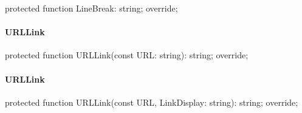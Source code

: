 \documentclass{report}
\newif\ifpdf
\begin{document}
\label{PasDoc_GenHtml.TGenericHTMLDocGenerator-LineBreak}
\begin{list}{}{
\setlength{\itemindent}{0cm}
\setlength{\listparindent}{0cm}
\setlength{\leftmargin}{\evensidemargin}
\addtolength{\leftmargin}{\tmplength}
\settowidth{\labelsep}{X}
\addtolength{\leftmargin}{\labelsep}
\setlength{\labelwidth}{\tmplength}
}
\item[\textbf{Declaration}\hfill]
\ifpdf
\begin{flushleft}
\fi
\begin{ttfamily}
protected function LineBreak: string; override;\end{ttfamily}

\ifpdf
\end{flushleft}
\fi

\end{list}
\paragraph*{URLLink}\hspace*{\fill}

\label{PasDoc_GenHtml.TGenericHTMLDocGenerator-URLLink}
\begin{list}{}{
\setlength{\itemindent}{0cm}
\setlength{\listparindent}{0cm}
\setlength{\leftmargin}{\evensidemargin}
\addtolength{\leftmargin}{\tmplength}
\settowidth{\labelsep}{X}
\addtolength{\leftmargin}{\labelsep}
\setlength{\labelwidth}{\tmplength}
}
\item[\textbf{Declaration}\hfill]
\ifpdf
\begin{flushleft}
\fi
\begin{ttfamily}
protected function URLLink(const URL: string): string; override;\end{ttfamily}

\ifpdf
\end{flushleft}
\fi

\end{list}
\paragraph*{URLLink}\hspace*{\fill}

\label{PasDoc_GenHtml.TGenericHTMLDocGenerator-URLLink}
\begin{list}{}{
\setlength{\itemindent}{0cm}
\setlength{\listparindent}{0cm}
\setlength{\leftmargin}{\evensidemargin}
\addtolength{\leftmargin}{\tmplength}
\settowidth{\labelsep}{X}
\addtolength{\leftmargin}{\labelsep}
\setlength{\labelwidth}{\tmplength}
}
\item[\textbf{Declaration}\hfill]
\ifpdf
\begin{flushleft}
\fi
\begin{ttfamily}
protected function URLLink(const URL, LinkDisplay: string): string; override;\end{ttfamily}

\ifpdf
\end{flushleft}
\fi

\end{list}
\end{document}
